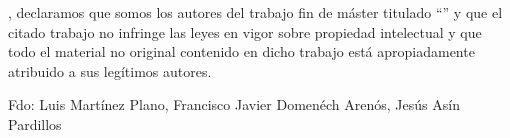 \thispagestyle{TFMFront}
{\TFMLightFont\fontsize{12}{14.75}\selectfont
\TFMAuthorsDeclaration, declaramos que somos los autores del trabajo fin de máster titulado ``\TFMTitle'' y que el citado trabajo no infringe las leyes en vigor sobre propiedad intelectual y que todo el material no original contenido en dicho trabajo está apropiadamente atribuido a sus legítimos autores.

\vspace{3.5mm}
\begin{center}
Fdo: Luis Martínez Plano, Francisco Javier Domenéch Arenós, Jesús Asín Pardillos
\end{center}
}
\clearpage

